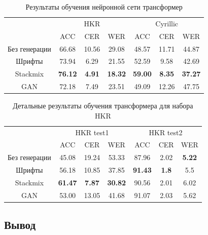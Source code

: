\begin{table}[h!]
    \centering
    \begin{tabular}{|c|c|c|c|c|c|c|}
        \hline
              & \multicolumn{3}{c|}{HKR} & \multicolumn{3}{c|}{Cyrillic} \\
        \cline{2-7}
                         &  ACC           &  CER           &  WER           &  ACC           &  CER           &  WER           \\
        \hline
        \hline
        Без генерации    & 66.68          & 10.56          & 29.08          & 48.57          & 11.71          & 44.87          \\
        Шрифты           & 73.94          & 6.29           & 21.55          & 52.59          & 9.58           & 42.69          \\
        Stackmix         & \textbf{76.12} & \textbf{4.91}  & \textbf{18.32} & \textbf{59.00} & \textbf{8.35}  & \textbf{37.27} \\
        GAN              & 72.18          & 7.49           & 23.51          & 49.09          & 12.26          & 47.75          \\
        \hline
    \end{tabular}
    \caption{Результаты обучения нейронной сети трансформер}
    \label{tab:transformer_htr_results}
\end{table}

\begin{table}[h!]
    \centering
    \begin{tabular}{|c|c|c|c|c|c|c|}
        \hline
        & \multicolumn{3}{c|}{HKR test1} & \multicolumn{3}{c|}{HKR test2} \\
        \cline{2-7}
                         &  ACC           &  CER           &  WER           &  ACC           &  CER           &  WER           \\
        \hline
        \hline
        Без генерации    & 45.08          & 19.24          & 53.33          & 87.96          & 2.02           & \textbf{5.22}  \\
        Шрифты           & 56.18          & 10.85          & 37.85          & \textbf{91.43} & \textbf{1.8}   & 5.5            \\
        Stackmix         & \textbf{61.47} & \textbf{7.87}  & \textbf{30.82} & 90.56          & 2.01           & 6.02           \\
        GAN              & 53.00          & 13.05          & 41.68          & 91.07          & 2.03           & 5.62           \\
        \hline
    \end{tabular}
    \caption{Детальные результаты обучения трансформера для набора HKR}
    \label{tab:transformer_htr_results_hkr}
\end{table}


\subsection{Вывод}
\label{subsec:experiment_conclusion}

